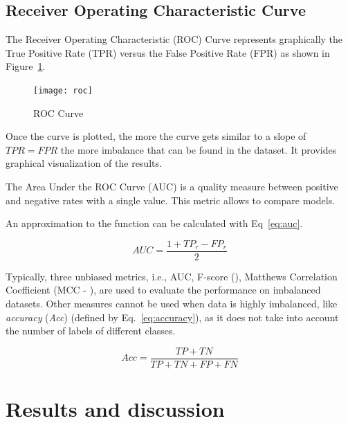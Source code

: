 \subsection{Receiver Operating Characteristic Curve}\label{sec:roc}

The Receiver Operating Characteristic (ROC)\cite{Fawcett2006} Curve represents 
graphically the True Positive Rate (TPR) versus the False Positive Rate (FPR) as 
shown in Figure~\ref{fig:roc}.

\begin{figure}
\centering
\texttt{[image: roc]} %
\caption{ROC Curve}
\label{fig:roc}
\end{figure}

Once the curve is plotted, the more the curve gets similar to a slope of 
$TPR = FPR$ the more imbalance that can be found in the dataset. It provides
graphical visualization of the results. 

The Area Under the ROC Curve (AUC) is a quality measure between positive and 
negative rates with a single value. This metric allows to compare models.

An approximation to the function can be calculated with Eq~\ref{eq:auc}.

\begin{equation}\label{eq:auc}
    AUC = \frac{1 + TP_{r} - FP_{r}}{2}
\end{equation}


Typically, three unbiased metrics, i.e., AUC, F-score 
(\cite{sorensen1948,dice1945}), Matthews Correlation Coefficient 
(MCC - \cite{Matthews1975}), are used to evaluate the performance on imbalanced 
datasets. Other measures cannot be used when data is highly imbalanced, like 
\textit{accuracy} (\textit{Acc}) (defined by Eq.~\ref{eq:accuracy}), as it does 
not take into account the number of labels of different classes.

\begin{equation}\label{eq:accuracy}
    Acc = \frac{TP + TN}{TP + TN + FP + FN}
\end{equation}

\section{Results and discussion}


